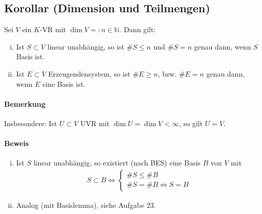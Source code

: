 \subsection{Korollar (Dimension und Teilmengen)}
	\begin{Korollar}
		Sei $ V $ ein $ K $-VR mit $\dim V =: n\in \mathbb{N}$. Dann gilt:
    \begin{enumerate}[(i)]
    	\item Ist $S \subset V$ linear unabhängig, so ist $\# S \leq n$ und $\# S = n$ genau dann, wenn $ S $ Basis ist.
    	\item Ist $E \subset V$ Erzeugendensystem, so ist $\#E \geq n$, bzw. $\#E = n$ genau dann, wenn $ E $ eine Basis ist.
    \end{enumerate}
	\end{Korollar}
    
\paragraph{Bemerkung}
	Insbesondere: Ist $U\subset V$ UVR mit $\dim U=\dim V < \infty$, so gilt $ U=V $.
   
\paragraph{Beweis}
    \begin{enumerate}[(i)]
    	\item Ist $ S $ linear unabhängig, so existiert (nach BES) eine Basis $ B $ von $ V $ mit 
			 \begin{gather*}
			    S\subset B\Leftrightarrow \left\{
				    \begin{array}{l}
					    \#S \leq \#B\\
						\#S = \#B \Leftrightarrow S = B
					\end{array}
			    \right.
		    \end{gather*}
		    \item Analog (mit Basislemma), siehe Aufgabe 23.
	 \end{enumerate} 
